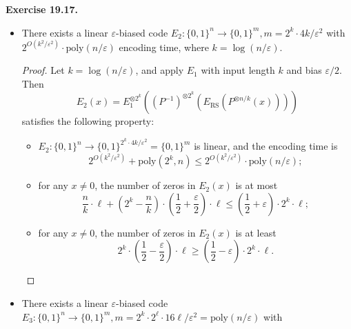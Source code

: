 \documentclass[a4paper]{article}
\newenvironment{exercise}[1]{
	\par
	\noindent\textbf{Exercise #1.}\quad
}{
	\par
	\bigskip
}
\newcommand{\pbra}[1]{\left( #1 \right)}
\newcommand{\bin}{\{0,1\}}
\newcommand{\eps}{\varepsilon}
\newcommand{\poly}{\text{poly}}
\begin{document}
\begin{exercise}{19.17}
\begin{itemize}
\begin{itemize}
\begin{proof}
$$                        \leq2e^{-2\eps^2m}<2^{-n}.
                        $$
                        Thus there exists a valid $A$ and we set $E_1(x)=Ax$. Moreover, $A$ can be found in time 
                        $$
                        \underbrace{2^{n\cdot m}}_\text{brute force $A$}\cdot\underbrace{2^n\cdot\poly(n)}_\text{check validity}.
                        $$
                        \end{proof}
                    \item There exists a linear $\eps$-biased code $E_2:\bin^n\to\bin^m,m=2^k\cdot 4k/\eps^2$ with
                        $2^{O\pbra{k^2/\eps^2}}\cdot\poly(n/\eps)$ encoding time, where $k=\log(n/\eps)$.
                        \begin{proof}
                        Let $k=\log(n/\eps)$, and apply $E_1$ with input length $k$ and bias $\eps/2$. Then 
                            $$
                            E_2(x)=E_1^{\otimes 2^k}\pbra{(P^{-1})^{\otimes 2^k}\pbra{E_\text{RS}\pbra{P^{\otimes n/k}(x)}}}
                            $$ 
                            satisfies the following property:
                            \begin{itemize}
                                \item $E_2:\bin^n\to\bin^{2^k\cdot 4k/\eps^2}=\bin^m$ is linear, 
                                    and the encoding time is 
                                    $$
                                    2^{O\pbra{k^2/\eps^2}}+\poly(2^k,n)\leq2^{O\pbra{k^2/\eps^2}}\cdot\poly(n/\eps);
                                    $$
                                \item for any $x\neq0$, the number of zeros in $E_2(x)$ is at most
                                    $$
                                    \frac nk\cdot\ell+\pbra{2^k-\frac nk}\cdot\pbra{\frac12+\frac\eps2}\cdot\ell
                                    \leq\pbra{\frac12+\eps}\cdot2^k\cdot\ell;
                                    $$
                                \item for any $x\neq0$, the number of zeros in $E_2(x)$ is at least
                                    $$
                                    2^k\cdot\pbra{\frac12-\frac\eps2}\cdot\ell
                                    \geq\pbra{\frac12-\eps}\cdot2^k\cdot\ell.
                                    $$
                            \end{itemize}
                        \end{proof}
                    \item There exists a linear $\eps$-biased code $E_3:\bin^n\to\bin^m,m=2^k\cdot 2^\ell\cdot16\ell/\eps^2=\poly(n/\eps)$ with

\end{itemize}
\end{itemize}
\end{exercise}
\end{document}
